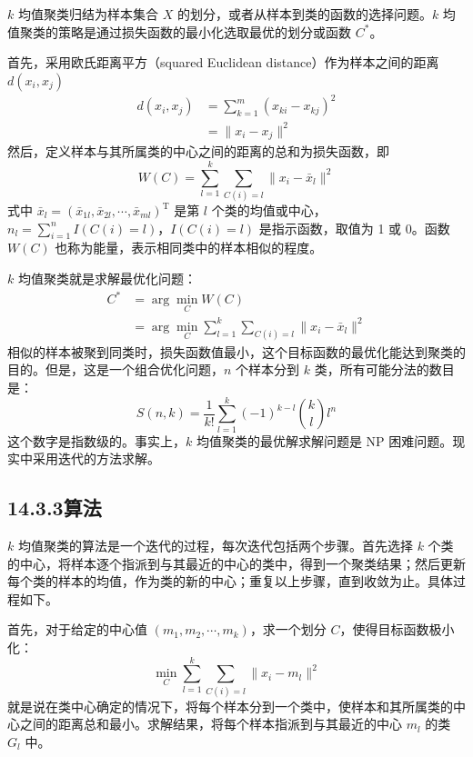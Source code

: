 \documentclass[UTF8, 12pt, fontset=fandol, oneside]{ctexart}
\begin{document}
$k$ 均值聚类归结为样本集合 $X$ 的划分，或者从样本到类的函数的选择问题。$k$ 均值聚类的策略是通过损失函数的最小化选取最优的划分或函数 $C^*$。

首先，采用欧氏距离平方（squared Euclidean distance）作为样本之间的距离 $d(x_i,x_j)$
\begin{equation}
\begin{aligned}
d(x_i,x_j)&=\sum_{k=1}^m (x_{ki}-x_{kj})^2\\
&=\|x_i-x_j\|^2
\end{aligned}
\tag{14.18}
\end{equation}
然后，定义样本与其所属类的中心之间的距离的总和为损失函数，即
\begin{equation}
W(C)=\sum_{l=1}^k\sum_{C(i)=l}\|x_i-\bar x_l\|^2
\tag{14.19}
\end{equation}
式中 $\bar x_l=(\bar x_{1l},\bar x_{2l},\cdots,\bar x_{ml})^{\mathrm{T}}$ 是第 $l$ 个类的均值或中心，$n_l=\sum_{i=1}^n I(C(i)=l)$，$I(C(i)=l)$ 是指示函数，取值为 1 或 0。函数 $W(C)$ 也称为能量，表示相同类中的样本相似的程度。

$k$ 均值聚类就是求解最优化问题：
\begin{equation}
\begin{aligned}
C^*&=\arg\min_C W(C)\\
&=\arg\min_C\sum_{l=1}^k\sum_{C(i)=l}\|x_i-\bar x_l\|^2
\end{aligned}
\tag{14.20}
\end{equation}
相似的样本被聚到同类时，损失函数值最小，这个目标函数的最优化能达到聚类的目的。但是，这是一个组合优化问题，$n$ 个样本分到 $k$ 类，所有可能分法的数目是：
\begin{equation}
S(n,k)=\frac{1}{k!}\sum_{l=1}^k(-1)^{k-l}\binom{k}{l}l^n
\tag{14.21}
\end{equation}
这个数字是指数级的。事实上，$k$ 均值聚类的最优解求解问题是 NP 困难问题。现实中采用迭代的方法求解。

\subsection*{14.3.3\quad 算法}

$k$ 均值聚类的算法是一个迭代的过程，每次迭代包括两个步骤。首先选择 $k$ 个类的中心，将样本逐个指派到与其最近的中心的类中，得到一个聚类结果；然后更新每个类的样本的均值，作为类的新的中心；重复以上步骤，直到收敛为止。具体过程如下。

首先，对于给定的中心值 $(m_1,m_2,\cdots,m_k)$，求一个划分 $C$，使得目标函数极小化：
\begin{equation}
\min_C\sum_{l=1}^k\sum_{C(i)=l}\|x_i-m_l\|^2
\tag{14.22}
\end{equation}
就是说在类中心确定的情况下，将每个样本分到一个类中，使样本和其所属类的中心之间的距离总和最小。求解结果，将每个样本指派到与其最近的中心 $m_l$ 的类 $G_l$ 中。
\end{document}
